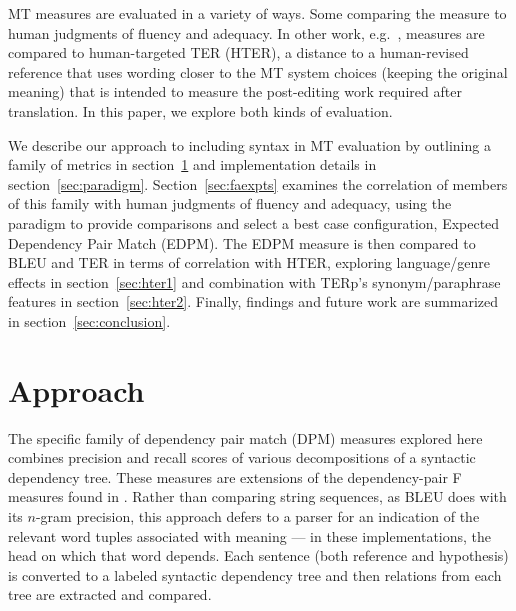 \documentclass{kluwer}    %
\begin{document}
\begin{article}
MT measures are evaluated in a variety of ways. Some
\cite{banerjee05meteor,liu05syntaxformteval,owczarzak07evaluatingmt}
comparing the measure to human
judgments of fluency and adequacy.  In other work, e.g.\
\cite{snover06ter}, measures are compared to
human-targeted TER (HTER), a distance to a human-revised reference
that uses wording closer to the MT system choices (keeping the
original meaning) that is intended to measure the post-editing work
required after translation.  In this paper, we explore both kinds of
evaluation.

We describe our approach to including syntax in MT
evaluation by outlining a family of metrics in
section~\ref{sec:approach} and implementation details in
section~\ref{sec:paradigm}.  Section~\ref{sec:faexpts} examines the
correlation of members of this family with human judgments of
fluency and adequacy, using the 
\cite{owczarzak07evaluatingmt} paradigm to provide comparisons and
select a best case configuration, Expected Dependency Pair Match
(EDPM). The EDPM measure is then compared to BLEU and TER in terms of
correlation with HTER, exploring language/genre effects in
section~\ref{sec:hter1} and combination with TERp's synonym/paraphrase
features in section~\ref{sec:hter2}. Finally, findings and future work
are summarized in section~\ref{sec:conclusion}.

\section{Approach}
\label{sec:approach}


The specific family of dependency pair match (DPM) measures explored here
combines precision and recall scores of various
decompositions of a syntactic dependency tree. These measures are
extensions of the dependency-pair F measures found in
.  Rather than comparing
string sequences, as BLEU does with its $n$-gram precision, this
approach defers to a parser for an indication of the relevant word
tuples associated with meaning --- in these implementations, the head
on which that word depends.  Each sentence (both reference and
hypothesis) is converted to a labeled syntactic dependency tree and
then relations from each tree are extracted and compared.


\end{article}
\end{document}
